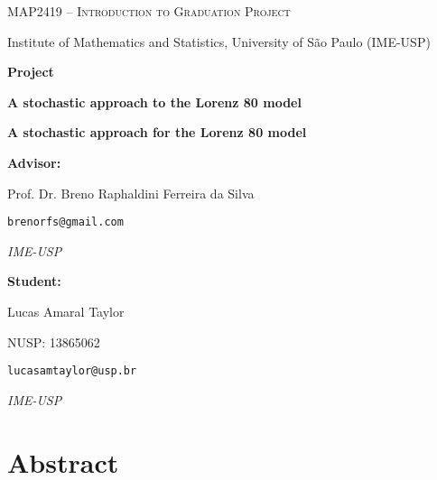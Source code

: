 \documentclass[12pt]{article}
\begin{document}
\begin{titlepage}
	\centering
	{\Large\scshape MAP2419 -- Introduction to Graduation Project \par}
	\vspace{0.3cm}
	{\large Institute of Mathematics and Statistics, University of São Paulo (IME-USP)\par}
	            
	\vspace{3cm}
	{\LARGE\bfseries Project\par}
	\vspace{1cm}
	{\LARGE\bfseries A stochastic approach to the Lorenz 80 model\par}
	    
	\vspace{0.5em}
	{\large\bfseries A stochastic approach for the Lorenz 80 model\par}
	    
	\vfill
	        
	\begin{minipage}[t]{0.45\textwidth}
		\raggedright
		\textbf{Advisor:} \par
		        
		Prof. Dr. Breno Raphaldini Ferreira da Silva  \par
		\texttt{brenorfs@gmail.com} \par
		\textit{IME-USP} \par\medskip
	\end{minipage}
	\hfill
	\begin{minipage}[t]{0.45\textwidth}
		        
		\raggedright
		\textbf{Student:} \par
		Lucas Amaral Taylor \par
		NUSP: 13865062 \par
		\texttt{lucasamtaylor@usp.br} \par
		\textit{IME-USP}
	\end{minipage}
	\vspace{2cm}
\end{titlepage}
\newpage
\section*{Abstract}
\begin{abstract}
	This paper presents a study of the Lorenz 80 Model, originally proposed by Edward Lorenz (1980), based on a stochastic approach inspired by \citet{Chekroun2021}. Essential theoretical foundations are addressed, such as the Mori-Zwanzig formalism, general properties of stochastic differential equations, and the mathematical and physical characteristics of the model itself. The computational development includes the implementation and numerical simulation of the model using the languages \textit{Julia} and \textit{Python}, with an emphasis on scientific libraries focused on stochastic dynamic systems and data analysis. Finally, an exploratory analysis of different configurations of the noise term is performed, with the aim of investigating alternative and complementary approaches to the original treatment.
\end{abstract}
\end{document}
